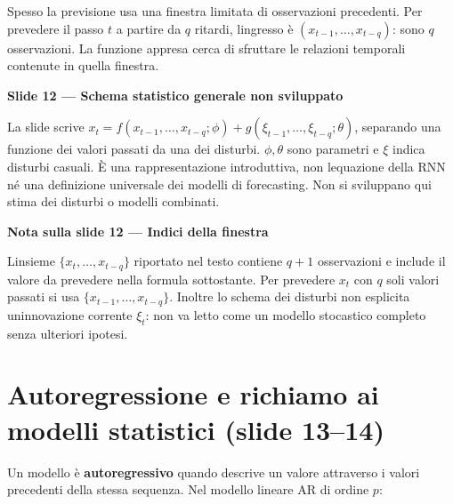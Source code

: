 \documentclass[11pt,a4paper,oneside,openany]{book}
\renewenvironment{quote}{\list{}{\leftmargin=1em\rightmargin=0pt}\item\relax}{\endlist}
\begin{document}
Spesso la previsione usa una finestra limitata di osservazioni precedenti. Per prevedere il passo \(t\) a partire da \(q\) ritardi, l\textquotesingle ingresso è \((x_{t-1},\ldots,x_{t-q})\): sono \(q\) osservazioni. La funzione appresa cerca di sfruttare le relazioni temporali contenute in quella finestra.

\begin{samepage}
\begin{quote}
\textbf{Slide 12 --- Schema statistico generale non sviluppato}
\end{quote}

\begin{quote}
La slide scrive \(x_t=f(x_{t-1},\ldots,x_{t-q};\phi)+g(\xi_{t-1},\ldots,\xi_{t-q};\theta)\), separando una funzione dei valori passati da una dei disturbi. \(\phi,\theta\) sono parametri e \(\xi\) indica disturbi casuali. È una rappresentazione introduttiva, non l\textquotesingle equazione della RNN né una definizione universale dei modelli di forecasting. Non si sviluppano qui stima dei disturbi o modelli combinati.
\end{quote}
\end{samepage}

\begin{quote}
\textbf{Nota sulla slide 12 --- Indici della finestra}
\end{quote}

\begin{quote}
L\textquotesingle insieme \(\{x_t,\ldots,x_{t-q}\}\) riportato nel testo contiene \(q+1\) osservazioni e include il valore da prevedere nella formula sottostante. Per prevedere \(x_t\) con \(q\) soli valori passati si usa \(\{x_{t-1},\ldots,x_{t-q}\}\). Inoltre lo schema dei disturbi non esplicita un\textquotesingle innovazione corrente \(\xi_t\): non va letto come un modello stocastico completo senza ulteriori ipotesi.
\end{quote}

\section{Autoregressione e richiamo ai modelli statistici (slide 13--14)}\label{f03-r139}

Un modello è \textbf{autoregressivo} quando descrive un valore attraverso i valori precedenti della stessa sequenza. Nel modello lineare AR di ordine \(p\):
\end{document}
